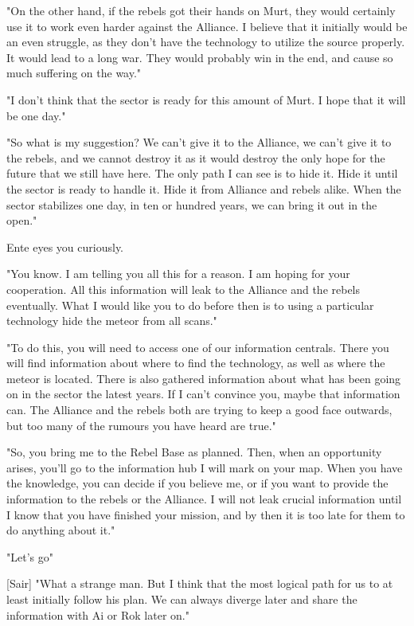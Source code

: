 \documentclass[a4paper,12pt]{article}
\begin{document}
"On the other hand, if the rebels got their hands on Murt, they would certainly use it to work even harder against the Alliance.
I believe that it initially would be an even struggle, as they don't have the technology to utilize the source properly.
It would lead to a long war. They would probably win in the end, and cause so much suffering on the way."

"I don't think that the sector is ready for this amount of Murt. I hope that it will be one day."

"So what is my suggestion? We can't give it to the Alliance, we can't give it to the rebels, and we cannot destroy it as it would
destroy the only hope for the future that we still have here. The only path I can see is to hide it. Hide it until the sector is ready
to handle it. Hide it from Alliance and rebels alike. When the sector stabilizes one day, in ten or hundred years, we can
bring it out in the open."

Ente eyes you curiously.

"You know. I am telling you all this for a reason. I am hoping for your cooperation. All this information will leak to the Alliance
and the rebels eventually. What I would like you to do before then is to using a particular technology hide the meteor from
all scans."

"To do this, you will need to access one of our information centrals. There you will find information about where to find the
technology, as well as where the meteor is located. There is also gathered information about what has been going on
in the sector the latest years. If I can't convince you, maybe that information can. The Alliance and the rebels both are trying
to keep a good face outwards, but too many of the rumours you have heard are true."

"So, you bring me to the Rebel Base as planned. Then, when an opportunity arises, you'll go to the information hub I will mark 
on your map. When you have the knowledge, you can decide if you believe me, or if you want to provide the information to
the rebels or the Alliance. I will not leak crucial information until I know that you have finished your mission,
and by then it is too late for them to do anything about it."

"Let's go"

[Sair] "What a strange man. But I think that the most logical path for us to at least initially follow his plan. We can always
diverge later and share the information with Ai or Rok later on."
\end{document}
